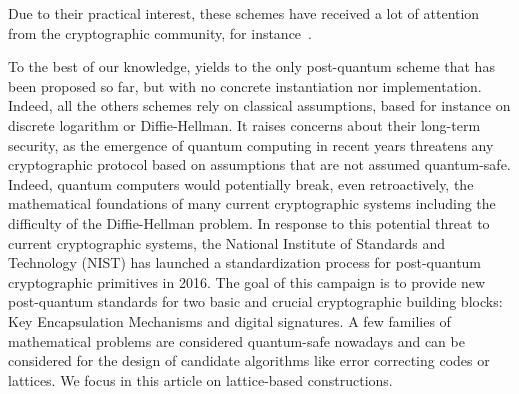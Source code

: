 

	Due to their practical interest, these schemes have received a 
lot of attention from the cryptographic community, for 
instance~\cite{10.5555/517876,EC:CamLys01,C:CamLys02,SCN:CamLys02,C:CamLys04,TCC:BCKL08,DBLP:conf/ima/IzabacheneLV11,NDSS:GarGreMie14,AC:CDHK15,ISC:BosCamNev18}.

To the best of our knowledge, \cite{ISC:BosCamNev18} yields to the only  
post-quantum scheme that has been proposed so far, but with no concrete
instantiation nor implementation.
Indeed, all the others schemes rely on classical assumptions, based for instance on discrete logarithm or Diffie-Hellman. 
It raises concerns about their long-term security, as the emergence of 
quantum computing in recent years threatens any cryptographic protocol 
based on assumptions that are not assumed quantum-safe. Indeed, quantum 
computers would potentially break, even retroactively, the mathematical 
foundations of many current cryptographic systems including the 
difficulty of the Diffie-Hellman problem. 
In response to this potential threat to current cryptographic 
systems, the National Institute of Standards and Technology (NIST) has 
launched a standardization process for post-quantum cryptographic 
primitives in 2016. The goal of this campaign is to provide new 
post-quantum standards for two basic and crucial cryptographic building 
blocks: Key Encapsulation Mechanisms and digital signatures. A few 
families of mathematical problems are considered quantum-safe nowadays 
and can be considered for the design of candidate algorithms like error 
correcting codes or lattices. We focus in this article on lattice-based 
constructions.



